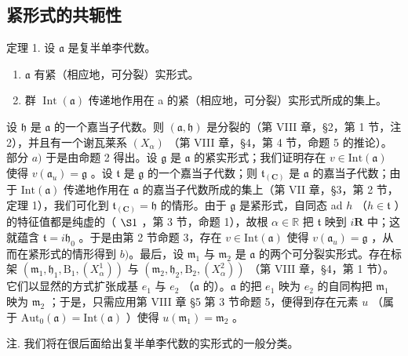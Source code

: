 \subsection{紧形式的共轭性}

定理 1. 设 \(\mathfrak{a}\) 是复半单李代数。

\begin{enumerate}
\def\labelenumi{\alph{enumi})}
\item
  \(\mathfrak{a}\) 有紧（相应地，可分裂）实形式。
\item
  群 \(\operatorname{Int}(\mathfrak{a})\) 传递地作用在 a 的紧（相应地，可分裂）实形式所成的集上。
\end{enumerate}

设 \(\mathfrak{h}\) 是 \(\mathfrak{a}\) 的一个嘉当子代数。则 \((\mathfrak{a},\mathfrak{h})\) 是分裂的（第 VIII 章，§2，第 1 节，注 2），并且有一个谢瓦莱系 \((X_{\alpha})\) （第 VIII 章，§4，第 4 节，命题 5 的推论）。部分 \(a)\) 于是由命题 2 得出。设 \(\mathfrak{g}\) 是 \(\mathfrak{a}\) 的紧实形式；我们证明存在 \(v\in\mathrm{Int}(\mathfrak{a})\) 使得 \(v(\mathfrak{a}_{u})=\mathfrak{g}\) 。设 \(\mathfrak{t}\) 是 \(\mathfrak{g}\) 的一个嘉当子代数；则 \(\mathfrak{t}_{(\mathbf{C})}\) 是 \(\mathfrak{a}\) 的嘉当子代数；由于 \(\mathrm{Int}(\mathfrak{a})\) 传递地作用在 \(\mathfrak{a}\) 的嘉当子代数所成的集上（第 VII 章，§3，第 2 节，定理 1），我们可化到 \(\mathfrak{t}_{(\mathbf{C})}=\mathfrak{h}\) 的情形。由于 \(\mathfrak{g}\) 是紧形式，自同态 ad \(h\) （\(h\in\mathfrak{t}\) ）的特征值都是纯虚的（ \(\S1\) ，第 3 节，命题 1），故根 \(\alpha\in\mathbb{R}\) 把 \(\mathfrak{t}\) 映到 \(i\mathbf{R}\) 中；这就蕴含 \(\mathfrak{t}=i\mathfrak{h}_{0}\) 。于是由第 2 节命题 3，存在 \(v\in\mathrm{Int}(\mathfrak{a})\) 使得 \(v(\mathfrak{a}_{u})=\mathfrak{g}\) ，从而在紧形式的情形得到 \(b)\)。最后，设 \(\mathfrak{m}_{1}\) 与 \(\mathfrak{m}_{2}\) 是 \(\mathfrak{a}\) 的两个可分裂实形式。存在标架 \((\mathfrak{m}_{1},\mathfrak{h}_{1},\mathrm{B}_{1},(X_{\alpha}^{1}))\) 与 \((\mathfrak{m}_{2},\mathfrak{h}_{2},\mathrm{B}_{2},(X_{\alpha}^{2}))\) （第 VIII 章，§4，第 1 节）。它们以显然的方式扩张成基 \(e_{1}\) 与 \(e_{2}\) （\(\mathfrak{a}\) 的）。\(\mathfrak{a}\) 的把 \(e_{1}\) 映为 \(e_{2}\) 的自同构把 \(\mathfrak{m}_{1}\) 映为 \(\mathfrak{m}_{2}\) ；于是，只需应用第 VIII 章 §5 第 3 节命题 5，便得到存在元素 \(u\) （属于 \(\mathrm{Aut}_{0}(\mathfrak{a})=\mathrm{Int}(\mathfrak{a})\) ）使得 \(u(\mathfrak{m}_{1})=\mathfrak{m}_{2}\) 。

注. 我们将在很后面给出复半单李代数的实形式的一般分类。

